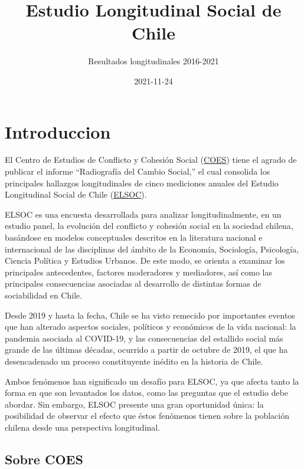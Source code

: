 \documentclass[
  12pt,
]{book}
\title{Estudio Longitudinal Social de Chile}
\subtitle{Resultados longitudinales 2016-2021}
\author{}
\date{\vspace{-2.5em}2021-11-24}
\begin{document}
\maketitle

{
\hypersetup{linkcolor=}
\setcounter{tocdepth}{1}
\tableofcontents
}
\listoftables
\listoffigures
{}
\hypertarget{introduccion}{%
\chapter{Introduccion}\label{introduccion}}

El Centro de Estudios de Conflicto y Cohesión Social (\href{https://coes.cl/}{COES}) tiene el agrado de publicar el informe ``Radiografía del Cambio Social,'' el cual consolida los principales hallazgos longitudinales de cinco mediciones anuales del Estudio Longitudinal Social de Chile (\href{https://coes.cl/encuesta-panel/}{ELSOC}).

ELSOC es una encuesta desarrollada para analizar longitudinalmente, en un estudio panel, la evolución del conflicto y cohesión social en la sociedad chilena, basándose en modelos conceptuales descritos en la literatura nacional e internacional de las disciplinas del ámbito de la Economía, Sociología, Psicología, Ciencia Política y Estudios Urbanos. De este modo, se orienta a examinar los principales antecedentes, factores moderadores y mediadores, así como las principales consecuencias asociadas al desarrollo de distintas formas de sociabilidad en Chile.

Desde 2019 y hasta la fecha, Chile se ha visto remecido por importantes eventos que han alterado aspectos sociales, políticos y económicos de la vida nacional: la pandemia asociada al COVID-19, y las consecuencias del estallido social más grande de las últimas décadas, ocurrido a partir de octubre de 2019, el que ha desencadenado un proceso constituyente inédito en la historia de Chile.

Ambos fenómenos han significado un desafío para ELSOC, ya que afecta tanto la forma en que son levantados los datos, como las preguntas que el estudio debe abordar. Sin embargo, ELSOC presente una gran oportunidad única: la posibilidad de observar el efecto que éstos fenómenos tienen sobre la población chilena desde una perspectiva longitudinal.

\hypertarget{sobre-coes}{%
\section{Sobre COES}\label{sobre-coes}}
\end{document}
